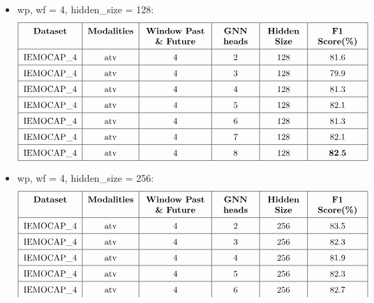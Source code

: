 \documentclass[a4paper]{article}
\begin{document}
\begin{itemize}
    \item wp, wf = 4, hidden\_size = 128:
        \[
        \renewcommand{\arraystretch}{1.5}
        \begin{tabular}{|c|c|p{2.5cm}<{\centering}|p{1.5cm}<{\centering}|p{1.5cm}<{\centering}|p{2cm}<{\centering}|}
            \hline
            \textbf{Dataset} & \textbf{Modalities} & \textbf{Window Past \& Future} & \textbf{GNN heads} & \textbf{Hidden Size} & \textbf{F1 Score(\%)} \\
            \hline
            \text{IEMOCAP\_4} & \text{atv} & 4 & 2 & 128 & 81.6 \\
            \hline
            \text{IEMOCAP\_4} & \text{atv} & 4 & 3 & 128 & 79.9 \\
            \hline
            \text{IEMOCAP\_4} & \text{atv} & 4 & 4 & 128 & 81.3 \\
            \hline
            \text{IEMOCAP\_4} & \text{atv} & 4 & 5 & 128 & 82.1 \\
            \hline
            \text{IEMOCAP\_4} & \text{atv} & 4 & 6 & 128 & 81.3 \\
            \hline
            \text{IEMOCAP\_4} & \text{atv} & 4 & 7 & 128 & 82.1 \\
            \hline
            \text{IEMOCAP\_4} & \text{atv} & 4 & 8 & 128 & \(\mathbf{82.5}\) \\
            \hline
        \end{tabular}    
        \]
    \item wp, wf = 4, hidden\_size = 256:
        \[
        \renewcommand{\arraystretch}{1.5}
        \begin{tabular}{|c|c|p{2.5cm}<{\centering}|p{1.5cm}<{\centering}|p{1.5cm}<{\centering}|p{2cm}<{\centering}|}
            \hline
            \textbf{Dataset} & \textbf{Modalities} & \textbf{Window Past \& Future} & \textbf{GNN heads} & \textbf{Hidden Size} & \textbf{F1 Score(\%)} \\
            \hline
            \text{IEMOCAP\_4} & \text{atv} & 4 & 2 & 256 & 83.5 \\
            \hline
            \text{IEMOCAP\_4} & \text{atv} & 4 & 3 & 256 & 82.3 \\
            \hline
            \text{IEMOCAP\_4} & \text{atv} & 4 & 4 & 256 & 81.9 \\
            \hline
            \text{IEMOCAP\_4} & \text{atv} & 4 & 5 & 256 & 82.3 \\
            \hline
            \text{IEMOCAP\_4} & \text{atv} & 4 & 6 & 256 & 82.7 \\

\end{tabular}\]
\end{itemize}
\end{document}
